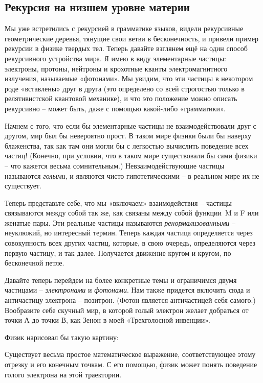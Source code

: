 \documentclass[../main.tex]{subfiles}
\begin{document}
\subsection{Рекурсия на низшем уровне материи}

Мы уже встретились с рекурсией в грамматике языков, видели рекурсивные геометрические деревья, тянущие свои ветви в бесконечность, и привели пример рекурсии в физике твердых тел. Теперь давайте взглянем ещё на один способ рекурсивного устройства мира. Я имею в виду элементарные частицы: электроны, протоны, нейтроны и крохотные кванты электромагнитного излучения, называемые «фотонами». Мы увидим, что эти частицы в некотором роде «вставлены» друг в друга (это определено со всей строгостью только в релятивистской квантовой механике), и что это положение можно описать рекурсивно \--- может быть, даже с помощью какой-либо «грамматики».

Начнем с того, что если бы элементарные частицы не взаимодействовали друг с другом, мир был бы невероятно прост. В таком мире физики были бы наверху блаженства, так как там они могли бы с легкостью вычислить поведение всех частиц! (Конечно, при условии, что в таком мире существовали бы сами физики \--- что кажется весьма сомнительным.) Невзаимодействующие частицы называются \emph{голыми}, и являются чисто гипотетическими \--- в реальном мире их не существует.

Теперь представьте себе, что мы «включаем» взаимодействия \--- частицы связываются между собой так же, как связаны между собой функции~M и F или женатые пары. Эти реальные частицы называются \emph{ренормализованными} \--- неуклюжий, но интересный термин. Теперь каждая частица определяется через совокупность всех других частиц, которые, в свою очередь, определяются через первую частицу, и так далее. Получается движение кругом и кругом, по бесконечной петле.

Давайте теперь перейдем на более конкретные темы и ограничимся двумя частицами \--- \emph{электронами} и \emph{фотонами}. Нам также придется включить сюда и античастицу электрона \--- позитрон. (Фотон является античастицей себя самого.) Вообразите себе скучный мир, в которой голый электрон желает добраться от точки А до точки В, как Зенон в моей «Трехголосной инвенции».

Физик нарисовал бы такую картину:

Существует весьма простое математическое выражение, соответствующее этому отрезку и его конечным точкам. С его помощью, физик может понять поведение голого электрона на этой траектории.
\end{document}
